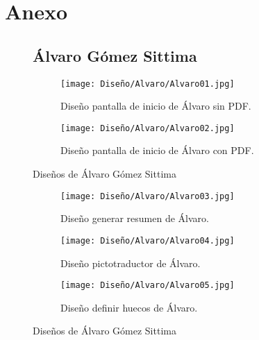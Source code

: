 \chapter{Anexo}
\label{cap:anexo}



\begin{figure}[ht!]
  \section{Álvaro Gómez Sittima}
  \begin{subfigure}{\textwidth}
    \centering
    \texttt{[image: Diseño/Alvaro/Alvaro01.jpg]}
    \caption{Diseño pantalla de inicio de Álvaro sin PDF.}
    \label{fig:disenyoAlvaro01}
  \end{subfigure}

  \begin{subfigure}{\textwidth}
    \centering
    \texttt{[image: Diseño/Alvaro/Alvaro02.jpg]}
    \caption{Diseño pantalla de inicio de Álvaro con PDF.}
    \label{fig:disenyoAlvaro02}
  \end{subfigure}
  \caption{Diseños de Álvaro Gómez Sittima}
  \label{fig:disenyoAlvaro}
\end{figure}

\begin{figure}[h!]
  \ContinuedFloat

  \begin{subfigure}{\textwidth}
    \centering
    \texttt{[image: Diseño/Alvaro/Alvaro03.jpg]}
    \caption{Diseño generar resumen de Álvaro.}
    \label{fig:disenyoAlvaro03}
  \end{subfigure}

  \begin{subfigure}{\textwidth}
    \centering
    \texttt{[image: Diseño/Alvaro/Alvaro04.jpg]}
    \caption{Diseño pictotraductor de Álvaro.}
    \label{fig:disenyoAlvaro04}
  \end{subfigure}

  \begin{subfigure}{\textwidth}
    \centering
    \texttt{[image: Diseño/Alvaro/Alvaro05.jpg]}
    \caption{Diseño definir huecos de Álvaro.}
    \label{fig:disenyoAlvaro05}
  \end{subfigure}

  \caption{Diseños de Álvaro Gómez Sittima}
  \label{fig:disenyoAlvaro}
\end{figure}


